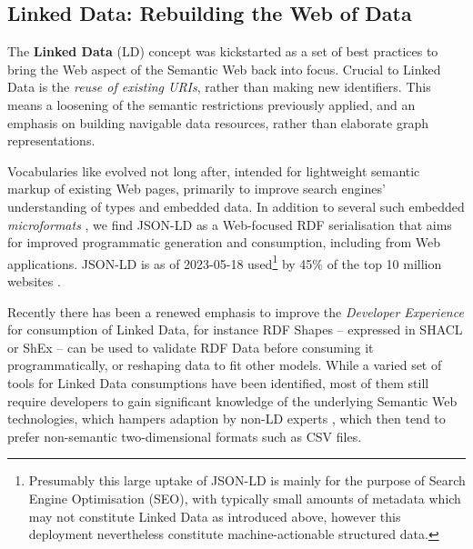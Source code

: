 \subsection{Linked Data: Rebuilding the Web of Data}\label{ch3:ld-web}

The \textbf{Linked Data} (LD) concept \cite{Bizer 2009} was kickstarted as a set of best practices \cite{LinkedDataDesign} to bring the Web aspect of the Semantic Web back into focus. Crucial to Linked Data is the \emph{reuse of existing URIs}, rather than making new identifiers. This means a loosening of the semantic restrictions previously applied, and an emphasis on building navigable data resources, rather than elaborate graph representations.

Vocabularies like  evolved not long after, intended for lightweight semantic markup of existing Web pages, primarily to improve search engines' understanding of types and embedded data. In addition to several such embedded \emph{microformats} \cite{OpenGraphProtocol,w3-rdfa-primer,HTMLStandard}, we find JSON-LD \cite{w3-json-ld} as a Web-focused RDF serialisation that aims for improved programmatic generation and consumption, including from Web applications. JSON-LD is as of 2023-05-18 used\footnote{Presumably this large uptake of JSON-LD is mainly for the purpose of Search Engine Optimisation (SEO), with typically small amounts of metadata which may not constitute Linked Data as introduced above, however this deployment nevertheless constitute machine-actionable structured data.} by 45\% of the top 10 million websites \cite{UsageStatisticsJSONLD}.

Recently there has been a renewed emphasis to improve the \emph{Developer Experience} \cite{DesigningLinkedData2018} for consumption of Linked Data, for instance RDF Shapes -- expressed in SHACL \cite{w3-shacl} or ShEx \cite{ShapeExpressionsShEx} -- can be used to validate RDF Data \cite{gayoValidatingRDFData2017a,thorntonUsingShapeExpressions2019a} before consuming it programmatically, or reshaping data to fit other models. While a varied set of tools for Linked Data consumptions have been identified, most of them still require developers to gain significant knowledge of the underlying Semantic Web technologies, which hampers adaption by non-LD experts \cite{klimekSurveyToolsLinked2019a}, which then tend to prefer non-semantic two-dimensional formats such as CSV files.


